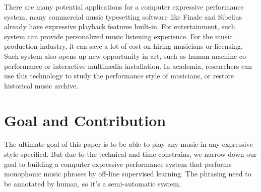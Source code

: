 
There are many potential applications for a computer expressive performance system, many commercial music typesetting software like Finale and Sibelius already have expressive playback features built-in. For entertainment, such system can provide personalized music listening experience. For the music production industry, it can save a lot of cost on hiring musicians or licensing. Such system also opens up new opportunity in art, such as human-machine co-performance or interactive multimedia installation. In academia, researchers can use this technology to study the performance style of musicians, or restore historical music archive.


%



\section{Goal and Contribution}
The ultimate goal of this paper is to be able to play any music in any expressive style specified. But due to the technical and time constrains, we narrow down our goal to building a computer expressive performance system that performs monophonic music phrases by off-line supervised learning. The phrasing need to be annotated by human, so it's a semi-automatic system.


